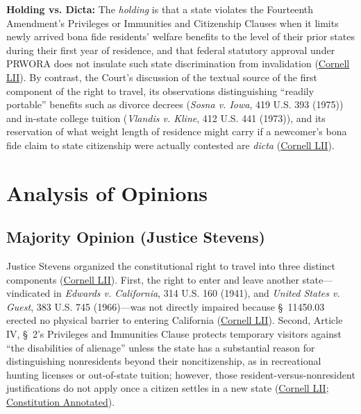 \documentclass[12pt]{article}
\begin{document}
\textbf{Holding vs. Dicta:} The \emph{holding} is that a state violates the Fourteenth Amendment's Privileges or Immunities and Citizenship Clauses when it limits newly arrived bona fide residents' welfare benefits to the level of their prior states during their first year of residence, and that federal statutory approval under PRWORA does not insulate such state discrimination from invalidation (\href{https://www.law.cornell.edu/supremecourt/text/98-97}{Cornell LII}). By contrast, the Court's discussion of the textual source of the first component of the right to travel, its observations distinguishing ``readily portable'' benefits such as divorce decrees (\textit{Sosna v. Iowa}, 419 U.S. 393 (1975)) and in-state college tuition (\textit{Vlandis v. Kline}, 412 U.S. 441 (1973)), and its reservation of what weight length of residence might carry if a newcomer's bona fide claim to state citizenship were actually contested are \emph{dicta} (\href{https://www.law.cornell.edu/supremecourt/text/98-97}{Cornell LII}).

\section{Analysis of Opinions}

\subsection{Majority Opinion (Justice Stevens)}

Justice Stevens organized the constitutional right to travel into three distinct components (\href{https://www.law.cornell.edu/supremecourt/text/98-97}{Cornell LII}). First, the right to enter and leave another state---vindicated in \textit{Edwards v. California}, 314 U.S. 160 (1941), and \textit{United States v. Guest}, 383 U.S. 745 (1966)---was not directly impaired because \S~11450.03 erected no physical barrier to entering California (\href{https://www.law.cornell.edu/supremecourt/text/98-97}{Cornell LII}). Second, Article IV, \S~2's Privileges and Immunities Clause protects temporary visitors against ``the disabilities of alienage'' unless the state has a substantial reason for distinguishing nonresidents beyond their noncitizenship, as in recreational hunting licenses or out-of-state tuition; however, those resident-versus-nonresident justifications do not apply once a citizen settles in a new state (\href{https://www.law.cornell.edu/supremecourt/text/98-97}{Cornell LII}; \href{https://www.law.cornell.edu/constitution-conan/article-4/section-2/clause-1/right-to-travel-and-privileges-and-immunities-clause}{Constitution Annotated}).
\end{document}
